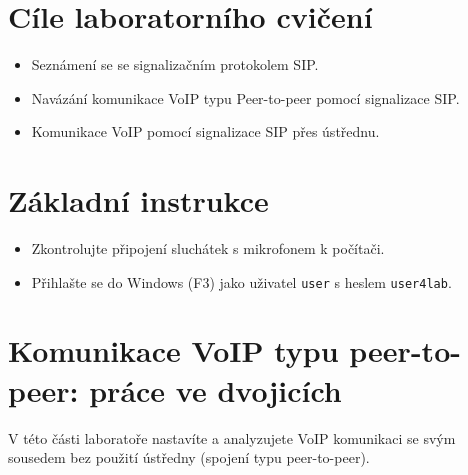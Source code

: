 \section*{Cíle laboratorního cvičení}
\begin{itemize}
  \item Seznámení se se signalizačním protokolem SIP.
  \item Navázání komunikace VoIP typu Peer-to-peer pomocí signalizace SIP.
  \item Komunikace VoIP pomocí signalizace SIP přes ústřednu.
\end{itemize}

\section*{Základní instrukce}
\begin{itemize}
  \item Zkontrolujte připojení sluchátek s mikrofonem k počítači. 
  \item Přihlašte se do Windows (F3) jako uživatel {\tt user} s heslem {\tt user4lab}.
\end{itemize}

\section{Komunikace VoIP typu peer-to-peer: práce ve dvojicích}
V této části laboratoře nastavíte a analyzujete VoIP komunikaci se svým sousedem bez použití ústředny (spojení typu peer-to-peer).

